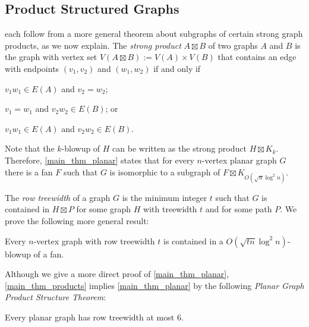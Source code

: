 \documentclass{patmorin}
\newcommand{\david}[1]{{\color{orange} David: #1}}
\newcommand{\defin}[1]{\emph{\textcolor{brightmaroon}{#1}}}
\begin{document}
\subsection{Product Structured Graphs}

 each follow from a more general theorem about subgraphs of certain strong graph products, as we now explain.  The \defin{strong product} $A\boxtimes B$ of two graphs $A$ and $B$ is the graph with vertex set $V(A\boxtimes B):=V(A)\times V(B)$ that contains an edge with endpoints $(v_1,v_2)$  and $(w_1,w_2)$ if and only if
\begin{compactenum}
    \item $v_1w_1\in E(A)$ and $v_2=w_2$;
    \item $v_1=w_1$ and $v_2w_2\in E(B)$; or
    \item $v_1w_1\in E(A)$ and $v_2w_2\in E(B)$.
\end{compactenum}
Note that the $k$-blowup of $H$ can be written as the strong product $H\boxtimes K_k$.  Therefore, \cref{main_thm_planar} states that for every $n$-vertex planar graph $G$ there is a fan $F$ such that $G$ is isomorphic to a subgraph of $F\boxtimes K_{O(\sqrt{n}\log^2 n)}$.


The \defin{row treewidth} of a graph $G$
is the minimum integer $t$ such that $G$ is contained in $H\boxtimes P$ for some graph $H$ with treewidth $t$ and for some path $P$. We prove the following more general result:


\begin{thm}\label{main_thm_products}
  Every $n$-vertex graph with row treewidth $t$ is contained in a $O(\sqrt{tn}\log^2 n)$-blowup of a fan.
\end{thm}

Although we give a more direct proof of \cref{main_thm_planar}, \cref{main_thm_products} implies \cref{main_thm_planar} by the following \defin{Planar Graph Product Structure Theorem}:

\begin{thm}\label{planar_product_structure}
  Every planar graph has row treewidth at most $6$.
\end{thm}
\end{document}
